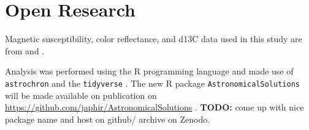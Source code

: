 \documentclass[draft]{agujournal2019}
\begin{document}
%
%

%

%



\section{Open Research}
Magnetic susceptibility, color reflectance, and \gls{d13C} data used in this
study are from  and .

Analysis was performed using the R programming language \cite{RCoreTeam2020}
and made use of \texttt{astrochron}  and the
\texttt{tidyverse} . The new R package
\texttt{AstronomicalSolutions} will be made available on publication on
\url{https://github.com/japhir/AstronomicalSolutions} .
\textbf{TODO:} come up with nice package name and host on github/ archive on
Zenodo.


\end{document}
